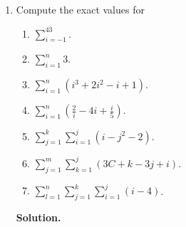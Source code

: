 \documentclass[9pt]{article}
\newcommand{\D}{\displaystyle}
\begin{document}
\begin{enumerate}
   \item Compute the exact values for

         \begin{enumerate}
            \item $\D\sum_{i=-1}^43$.
            \item $\D\sum_{i=1}^n3$.
            \item $\D\sum_{i=1}^n (i^3 + 2i^2 - i + 1)$.
            \item $\D\sum_{i=1}^n \left(\frac{2}{i} - 4i + \frac{i}{5}\right)$.
            \item $\D\sum_{j=1}^k\sum_{i=1}^j (i - j^2 - 2)$.
            \item $\D\sum_{j=1}^m\sum_{k=1}^j (3C + k - 3j + i)$.
            \item $\D\sum_{l=1}^n\sum_{j=1}^k\sum_{i=1}^j (i - 4)$.
         \end{enumerate}
      
      \textbf{Solution.} 


\end{enumerate}
\end{document}
